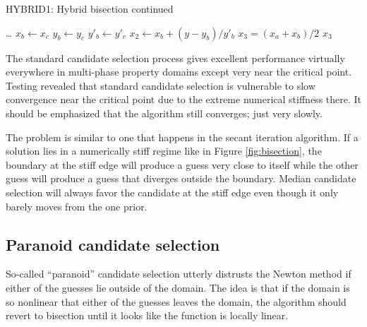 \begin{algorithm}
\caption{HYBRID1: Hybrid bisection continued}
\begin{algorithmic}
        \State \ldots
    \Else {}
        \State $x_b \gets x_c$ 
        \State $y_b \gets y_c$
        \State $y'_b \gets y'_c$
        \State $x_2 \gets x_b + (y - y_b)/y'_b$ 
    \EndIf
    \State $x_3 = (x_a + x_b)/2$    
\EndWhile
\State \Return $x_3$    
\EndProcedure
\end{algorithmic}
\end{algorithm}

The standard candidate selection process gives excellent performance virtually everywhere in multi-phase property domains except very near the critical point.  Testing revealed that standard candidate selection is vulnerable to slow convergence near the critical point due to the extreme numerical stiffness there.  It should be emphasized that the algorithm still converges; just very slowly.

The problem is similar to one that happens in the secant iteration algorithm.  If a solution lies in a numerically stiff regime like in Figure \ref{fig:bisection}, the boundary at the stiff edge will produce a guess very close to itself while the other guess will produce a guess that diverges outside the boundary.  Median candidate selection will always favor the candidate at the stiff edge even though it only barely moves from the one prior.

\subsection{Paranoid candidate selection}

So-called ``paranoid'' candidate selection utterly distrusts the Newton method if either of the guesses lie outside of the domain.  The idea is that if the domain is so nonlinear that either of the guesses leaves the domain, the algorithm should revert to bisection until it looks like the function is locally linear.

